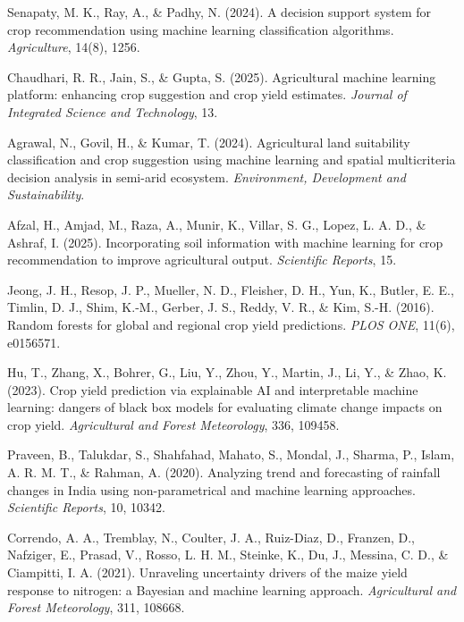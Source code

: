 \documentclass[12pt,a4paper,twocolumn]{article}
\begin{document}
\begin{enumerate}[label={[\arabic*]}, leftmargin=*, itemsep=4pt]
\item Senapaty, M. K., Ray, A., \& Padhy, N. (2024). A decision support system for
crop recommendation using machine learning classification algorithms.
\emph{Agriculture}, 14(8), 1256.

\item Chaudhari, R. R., Jain, S., \& Gupta, S. (2025). Agricultural machine learning
platform: enhancing crop suggestion and crop yield estimates. \emph{Journal of
Integrated Science and Technology}, 13.

\item Agrawal, N., Govil, H., \& Kumar, T. (2024). Agricultural land suitability
classification and crop suggestion using machine learning and spatial multicriteria
decision analysis in semi-arid ecosystem. \emph{Environment, Development and
Sustainability}.

\item Afzal, H., Amjad, M., Raza, A., Munir, K., Villar, S. G., Lopez, L. A. D., \&
Ashraf, I. (2025). Incorporating soil information with machine learning for crop
recommendation to improve agricultural output. \emph{Scientific Reports}, 15.

\item Jeong, J. H., Resop, J. P., Mueller, N. D., Fleisher, D. H., Yun, K., Butler,
E. E., Timlin, D. J., Shim, K.-M., Gerber, J. S., Reddy, V. R., \& Kim, S.-H. (2016).
Random forests for global and regional crop yield predictions. \emph{PLOS ONE},
11(6), e0156571.

\item Hu, T., Zhang, X., Bohrer, G., Liu, Y., Zhou, Y., Martin, J., Li, Y., \& Zhao,
K. (2023). Crop yield prediction via explainable AI and interpretable machine
learning: dangers of black box models for evaluating climate change impacts on crop
yield. \emph{Agricultural and Forest Meteorology}, 336, 109458.

\item Praveen, B., Talukdar, S., Shahfahad, Mahato, S., Mondal, J., Sharma, P.,
Islam, A. R. M. T., \& Rahman, A. (2020). Analyzing trend and forecasting of
rainfall changes in India using non-parametrical and machine learning approaches.
\emph{Scientific Reports}, 10, 10342.

\item Correndo, A. A., Tremblay, N., Coulter, J. A., Ruiz-Diaz, D., Franzen, D.,
Nafziger, E., Prasad, V., Rosso, L. H. M., Steinke, K., Du, J., Messina, C. D., \&
Ciampitti, I. A. (2021). Unraveling uncertainty drivers of the maize yield response
to nitrogen: a Bayesian and machine learning approach. \emph{Agricultural and Forest
Meteorology}, 311, 108668.


\end{enumerate}
\end{document}
